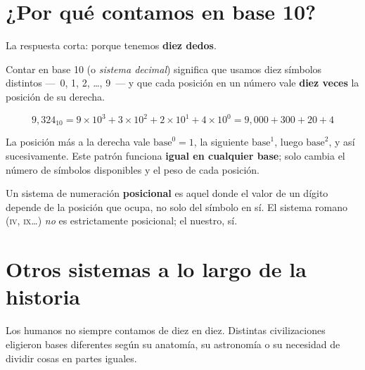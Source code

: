 \documentclass[12pt, oneside]{article}
\begin{document}

\tableofcontents
\newpage

\section{¿Por qué contamos en base 10?}

La respuesta corta: porque tenemos \textbf{diez dedos}.

Contar en base 10 (o \textit{sistema decimal}) significa que usamos diez
símbolos distintos —~0, 1, 2, \ldots, 9~— y que cada posición en un número
vale \textbf{diez veces} la posición de su derecha.

\begin{ejemplo}
\[
  9{,}324_{10}
  = 9 \times 10^3 + 3 \times 10^2 + 2 \times 10^1 + 4 \times 10^0
  = 9{,}000 + 300 + 20 + 4
\]
\end{ejemplo}

La posición más a la derecha vale $\text{base}^0 = 1$, la siguiente
$\text{base}^1$, luego $\text{base}^2$, y así sucesivamente.
Este patrón funciona \textbf{igual en cualquier base}; solo cambia el número
de símbolos disponibles y el peso de cada posición.

\begin{recuerda}
  Un sistema de numeración \textbf{posicional} es aquel donde el valor de
  un dígito depende de la posición que ocupa, no solo del símbolo en sí.
  El sistema romano (\textsc{iv}, \textsc{ix}\ldots) \textit{no} es
  estrictamente posicional; el nuestro, sí.
\end{recuerda}

\section{Otros sistemas a lo largo de la historia}

Los humanos no siempre contamos de diez en diez.
Distintas civilizaciones eligieron bases diferentes según su anatomía,
su astronomía o su necesidad de dividir cosas en partes iguales.

\end{document}
